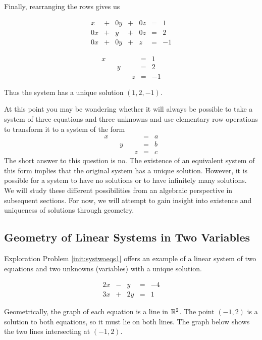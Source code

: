 \documentclass{ximera}
\begin{document}
\begin{example}
\begin{explanation}
Finally, rearranging the rows gives us

$$\begin{array}{ccccccc}
     x& +&0y&+&0z&=&1\\
     0x & +&y&+&0z&= &2 \\
	 0x& +&0y&+&z&=&-1
     \end{array}$$
     
 $$\begin{array}{ccccccc}
     x& &&&&=&1\\
      & &y&&&= &2 \\
	 &&&&z&=&-1
     \end{array}$$    
     
Thus the system has a unique solution $(1, 2, -1)$.
\end{explanation}
    
\end{example}

At this point you may be wondering whether it will always be possible to take a system of three equations and three unknowns and use elementary row operations to transform it to a system of the form
$$\begin{array}{ccccccc}
      x & &&&&= &a \\
	 & &y&&&=&b\\
     & &&&z&=&c
    \end{array}$$
The short answer to this question is no.  The existence of an equivalent system of this form implies that the original system has a unique solution.  However, it is possible for a system to have no solutions or to have infinitely many solutions.  We will study these different possibilities from an algebraic perspective in subsequent sections.  For now, we will attempt to gain insight into existence and uniqueness of solutions through geometry.     

\subsection*{Geometry of Linear Systems in Two Variables}
Exploration Problem \ref{init:systwoeqs1} offers an example of a linear system of two equations and two unknowns (variables) with a unique solution.  

$$\begin{array}{ccccc}
      2x& -&y&=&-4\\
      3x & +&2y&= &1 
    \end{array}$$

Geometrically, the graph of each equation is a line in $\mathbb{R}^2$.  The point $(-1, 2)$ is a solution to both equations, so it must lie on both lines.
  The graph below shows the two lines intersecting at $(-1, 2)$.    
    
\end{document}
